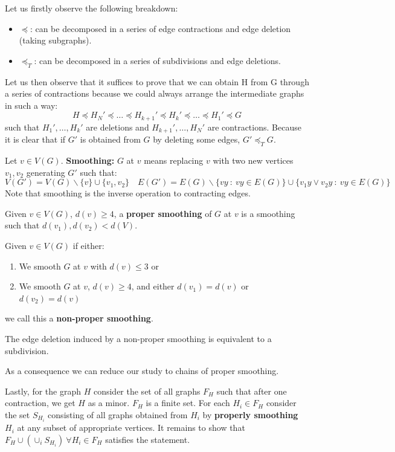 Let us firstly observe the following breakdown:
\begin{itemize}
    \item $\preceq$: can be decomposed in a series of edge contractions and edge deletion (taking subgraphs).
    \item $\preceq_{T}$: can be decomposed in a series of subdivisions and edge deletions.
\end{itemize}
Let us then observe that it suffices to prove that we can obtain H from G through a series of contractions because we could always arrange the intermediate graphs in such a way:
$$H \preceq H_N' \preceq \dots \preceq H_{k+1}' \preceq H_k' \preceq \dots \preceq H_1' \preceq G$$
such that $H_1', \dots, H_k'$ are deletions and $H_{k+1}', \dots, H_N'$ are contractions.
Because it is clear that if $G'$ is obtained from $G$ by deleting some edges, $G' \preceq_T G$.

\begin{definition}[Smoothing]
    Let $v \in V(G)$.
    \textbf{Smoothing:} $G$ at $v$ means replacing $v$ with two new vertices $v_1, v_2$ generating $G'$ such that:
    $$V(G') = V(G)\backslash \{v\} \cup \{v_1, v_2\} \quad E(G') = E(G)\backslash \{ vy \: : \: vy \in E(G) \} \cup \{ v_1y \vee v_2y \: : \: vy \in E(G) \}$$
    Note that smoothing is the inverse operation to contracting edges.
\end{definition}

\begin{definition}
    Given $v \in V(G)$, $d(v) \geq 4$, a \textbf{proper smoothing} of $G$ at $v$ is a smoothing such that $d(v_1), d(v_2) < d(V)$.
\end{definition}

\begin{definition}
    Given $v \in V(G)$ if either:
    \begin{enumerate}
        \item We smooth $G$ at $v$ with $d(v) \leq 3$ or
        \item We smooth $G$ at $v$, $d(v) \geq 4$, and either $d(v_1) = d(v)$ or $d(v_2) = d(v)$
    \end{enumerate}
    we call this a \textbf{non-proper smoothing}.
\end{definition}

\begin{claim}
    The edge deletion induced by a non-proper smoothing is equivalent to a subdivision.
\end{claim}

As a consequence we can reduce our study to chains of proper smoothing.

Lastly, for the graph $H$ consider the set of all graphs $F_H$ such that after one contraction, we get $H$ as a minor.
$F_H$ is a finite set.
For each $H_i \in F_H$ consider the set $S_{H_i}$ consisting of all graphs obtained from $H_i$ by \textbf{properly smoothing} $H_i$ at any subset of appropriate vertices.
It remains to show that $F_H \cup (\cup_i S_{H_i}) \: \forall H_i \in F_H$ satisfies the statement.
